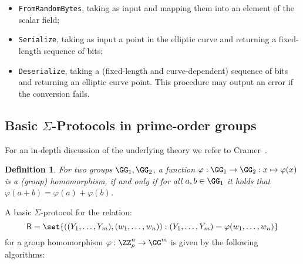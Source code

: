 \documentclass[runningheads,11pt]{article}
\newtheorem{definition}{Definition}
\begin{document}
\begin{itemize}
  \item \texttt{FromRandomBytes}, taking as input \seedlen and mapping them into an element of the scalar field;
  \item \texttt{Serialize}, taking as input a point in the elliptic curve and returning a fixed-length sequence of bits;
  \item \texttt{Deserialize}, taking a (fixed-length and curve-dependent) sequence of bits and returning an elliptic curve point. This procedure may output an error if the conversion fails.
\end{itemize}

\subsection{Basic $\Sigma$-Protocols in prime-order groups}
For an in-depth discussion of the underlying theory we refer to Cramer~\cite{cramer97}.
 \begin{definition}
  For two groups $\GG_1,\GG_2$, a function $\varphi:\GG_1\to\GG_2:x\mapsto\varphi(x)$ is a \emph{(group) homomorphism}, if and only if for all $a,b\in\GG_1$ it holds that $\varphi(a+b)=\varphi(a)+\varphi(b)$.
\end{definition}




\label{sec:sigma-dlog}
A basic $\Sigma$-protocol for the relation:
\[
  \relation=\set{((\statement_1,\dots,\statement_m),(w_1,\dots,w_n)) : (\statement_1,\dots,\statement_m)=\varphi(w_1,\dots,w_n)}
\]
 for a group homomorphism $\varphi:\ZZ_p^n\to\GG^m$ is given by the following algorithms:
\end{document}
